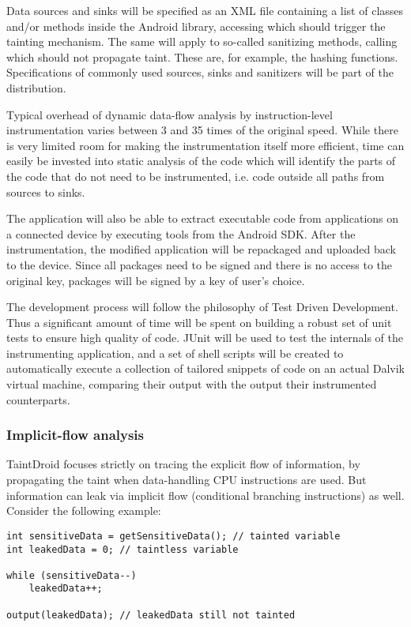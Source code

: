 \documentclass[12pt]{article}
\begin{document}
Data sources and sinks will be specified as an XML file containing a list
of classes and/or methods inside the Android library, accessing which
should trigger the tainting mechanism. The same will apply to so-called 
sanitizing methods, calling which should not propagate taint. These
are, for example, the hashing functions. Specifications of commonly used 
sources, sinks and sanitizers will be part of the distribution.

Typical overhead of dynamic data-flow analysis by instruction-level 
instrumentation varies between 3 and 35 times of the original speed. While 
there is very limited room for making the instrumentation itself more 
efficient, time can easily be invested into static analysis of the code which 
will identify the parts of the code that do not need to be instrumented, 
i.e. code outside all paths from sources to sinks. 

The application will also be able to extract executable code from 
applications on a connected device by executing tools from the Android SDK.
After the instrumentation, the modified application will be repackaged and
uploaded back to the device. Since all packages need to be signed and there
is no access to the original key, packages will be signed by a key of user's
choice.

The development process will follow the philosophy of Test Driven 
Development. Thus a significant amount of time will be spent on building 
a robust set of unit tests to ensure high quality of code. JUnit will be 
used to test the internals of the instrumenting application, and a set of 
shell scripts will be created to automatically execute a collection
of tailored snippets of code on an actual Dalvik virtual machine, 
comparing their output with the output their instrumented counterparts.

\subsubsection*{Implicit-flow analysis}

TaintDroid focuses strictly on tracing the explicit flow of information, 
by propagating the taint when data-handling CPU instructions are used. 
But information can leak via implicit flow (conditional branching 
instructions) as well. Consider the following example:

\begin{verbatim}
int sensitiveData = getSensitiveData(); // tainted variable
int leakedData = 0; // taintless variable

while (sensitiveData--)
    leakedData++;

output(leakedData); // leakedData still not tainted
\end{verbatim}
\end{document}
